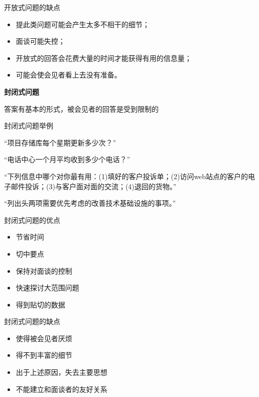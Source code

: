 开放式问题的缺点
\begin{itemize}
    \item 提此类问题可能会产生太多不相干的细节；
    \item 面谈可能失控；
    \item 开放式的回答会花费大量的时间才能获得有用的信息量；
    \item 可能会使会见者看上去没有准备。
\end{itemize}

\textbf{封闭式问题} \par
答案有基本的形式，被会见者的回答是受到限制的 

封闭式问题举例
\vspace{-0.25em}
{\kaishu \begin{compactitem}
    \item “项目存储库每个星期更新多少次？”
    \item “电话中心一个月平均收到多少个电话？”
    \item “下列信息中哪个对你最有用：(1)填好的客户投诉单；(2)访问web站点的客户的电子邮件投诉；(3)与客户面对面的交流；(4)退回的货物。”
    \item “列出头两项需要优先考虑的改善技术基础设施的事项。”
\end{compactitem}}

封闭式问题的优点
\vspace{-0.8em}
\begin{multicols}{2}
    \begin{itemize}
        \item 节省时间
        \item 切中要点
        \item 保持对面谈的控制
        \item 快速探讨大范围问题
        \item 得到贴切的数据
    \end{itemize}
\end{multicols}
\vspace{-1em}

封闭式问题的缺点
\vspace{-0.8em}
\begin{multicols}{2}
    \begin{itemize}
        \item 使得被会见者厌烦
        \item 得不到丰富的细节
        \item 出于上述原因，失去主要思想
        \item 不能建立和面谈者的友好关系
    \end{itemize}
\end{multicols}
\vspace{-1em}

